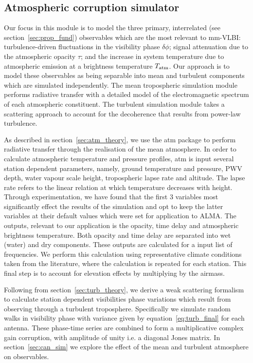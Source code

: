 \subsection{Atmospheric corruption simulator}\label{sec:trop_imp}

Our focus in this module is to model the three primary, interrelated (see section~\ref{sec:prop_fund}) observables which are the most relevant to mm-VLBI: turbulence-driven fluctuations in the visibility phase $\delta \phi$; signal attenuation due to the atmospheric opacity $\tau$; and the increase in system temperature due to atmospheric emission at a brightness temperature $T_{\rm atm}$. Our approach is to model these observables as being separable into mean and turbulent components which are simulated independently. The mean tropospheric simulation module performs radiative transfer with a detailed model of the electromagnetic spectrum of each atmospheric constituent. The turbulent simulation module takes a scattering approach to account for the decoherence that results from power-law turbulence.

As described in section~\ref{sec:atm_theory}, we use the {\sc atm} package to perform radiative transfer through the realisation of the mean atmosphere. 
In order to calculate atmospheric temperature and pressure profiles, {\sc atm} is input several station dependent parameters, namely, ground temperature and pressure, PWV depth, water vapour scale height, tropospheric lapse rate  and altitude. The lapse rate refers to the linear relation at which temperature decreases with height. Through experimentation, we have found that the first 3 variables most significantly effect the results of the simulation and opt to keep the latter variables at their default values which were set for application to ALMA. 
The outputs, relevant to our application is the opacity, time delay and atmospheric brightness temperature. Both opacity and time delay are separated into wet (water) and dry components. These outputs are calculated for a input list of frequencies.
We perform this calculation using representative climate conditions taken from the literature, where the calculation is repeated for each station. This final step is to account for elevation effects by multiplying by the airmass. 

Following from section~\ref{sec:turb_theory}, we derive a weak scattering formalism to calculate station dependent visibilities phase variations which result from observing through a turbulent troposphere. Specifically we simulate random walks in visibility phase with variance given by equation~\ref{eq:turb_final} for each antenna. These phase-time series are combined to form a multiplicative complex gain corruption, with amplitude of unity i.e. a diagonal Jones matrix. In section~\ref{sec:can_sim} we explore the effect of the mean and turbulent atmosphere on observables.

